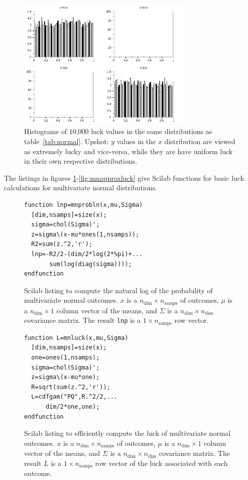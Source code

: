 \begin{figure}
  \caption{Histograms of 10,000 luck values in the same distributions as table~\ref{tab:normal}.  Upshot: $y$ values in the $x$ distribution are viewed as extremely lucky and vice-versa, while they are have uniform luck in their own respective distributions.}
  \centering
    \includegraphics[width=0.75\textwidth]{img/normal}
\end{figure}

The listings in figures \ref{fig:mnprobln}-\ref{fig:mnapproxluck} give Scilab functions for basic luck calculations for multivariate normal distributions.

\begin{figure}
\caption{\label{fig:mnprobln}Scilab listing to compute the natural log of the probability of multivariate normal outcomes.  $x$ is a $n_{\text{dim}} \times n_{\text{samps}}$ of outcomes, $\mu$ is a $n_{\text{dim}} \times 1$ column vector of the means, and $\Sigma$ is a $n_{\text{dim}} \times n_{\text{dim}}$ covariance matrix.  The result {\tt lnp} is a $1 \times n_{\text{samps}}$ row vector.}
\lstset{language=Scilab}
\begin{lstlisting}
function lnp=mnprobln(x,mu,Sigma)
  [dim,nsamps]=size(x);
  sigma=chol(Sigma)';
  z=sigma\(x-mu*ones(1,nsamps));
  R2=sum(z.^2,'r');
  lnp=-R2/2-(dim/2*log(2*%pi)+...
       sum(log(diag(sigma))));
endfunction
\end{lstlisting}
\end{figure}

\begin{figure}
\caption{\label{fig:mnluck}Scilab listing to efficiently compute the luck of multivariate normal outcomes.  $x$ is a $n_{\text{dim}} \times n_{\text{samps}}$ of outcomes, $\mu$ is a $n_{\text{dim}} \times 1$ column vector of the means, and $\Sigma$ is a $n_{\text{dim}} \times n_{\text{dim}}$ covariance matrix.  The result $L$ is a $1 \times n_{\text{samps}}$ row vector of the luck associated with each outcome.}
\lstset{language=Scilab}
\begin{lstlisting}
function L=mnluck(x,mu,Sigma)
  [dim,nsamps]=size(x);
  one=ones(1,nsamps);
  sigma=chol(Sigma)';
  z=sigma\(x-mu*one);
  R=sqrt(sum(z.^2,'r'));
  L=cdfgam("PQ",R.^2/2,...
      dim/2*one,one);
endfunction
\end{lstlisting}
\end{figure}

